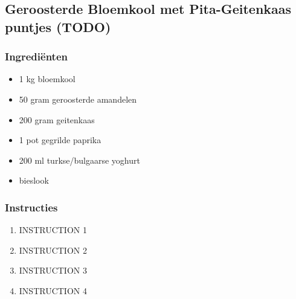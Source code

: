 \subsection{Geroosterde Bloemkool met Pita-Geitenkaas puntjes (TODO)}
\subsubsection*{Ingrediënten}
\begin{multicols}{2}
    \begin{itemize}
        \item 1 kg bloemkool
        \item 50 gram geroosterde amandelen
        \item 200 gram geitenkaas
        \item 1 pot gegrilde paprika
        \item 200 ml turkse/bulgaarse yoghurt
        \item bieslook
    \end{itemize}
\end{multicols}

\subsubsection*{Instructies}
\begin{multicols}{2}
    \begin{enumerate}
        \item INSTRUCTION 1
        \item INSTRUCTION 2
        \item INSTRUCTION 3
        \item INSTRUCTION 4
    \end{enumerate}
\end{multicols}